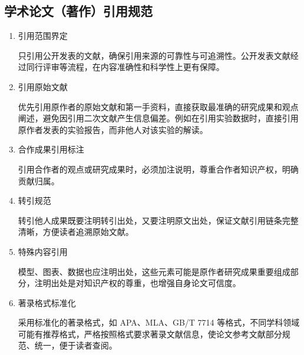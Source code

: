 \documentclass{amznotes}
\begin{document}
\subsection{学术论文（著作）引用规范}
\begin{enumerate}
  \item 引用范围界定

  只引用公开发表的文献，确保引用来源的可靠性与可追溯性。公开发表文献经过同行评审等流程，在内容准确性和科学性上更有保障。

  \item 引用原始文献

  优先引用原作者的原始文献和第一手资料，直接获取最准确的研究成果和观点阐述，避免因引用二次文献产生信息偏差。例如在引用实验数据时，直接引用原作者发表的实验报告，而非他人对该实验的解读。

  \item 合作成果引用标注

  引用合作者的观点或研究成果时，必须加注说明，尊重合作者知识产权，明确贡献归属。

  \item 转引规范

  转引他人成果既要注明转引出处，又要注明原文出处，保证文献引用链条完整清晰，方便读者追溯原始文献。

  \item 特殊内容引用

  模型、图表、数据也应注明出处，这些元素可能是原作者研究成果重要组成部分，注明出处是对知识产权的尊重，也增强自身论文可信度。

  \item 著录格式标准化

  采用标准化的著录格式，如 APA、MLA、GB/T 7714 等格式，不同学科领域可能有推荐格式，严格按照格式要求著录文献信息，使论文参考文献部分规范、统一，便于读者查阅。

\end{enumerate}
\end{document}
